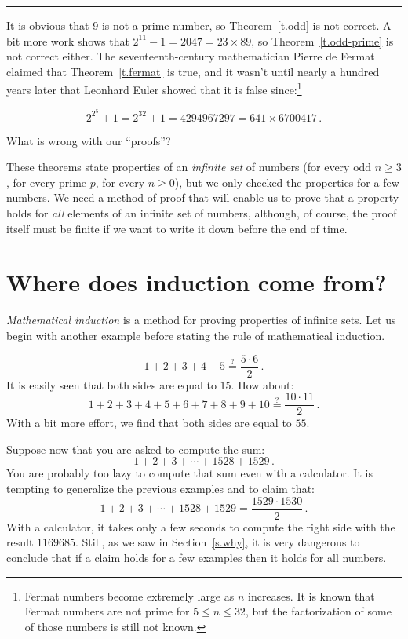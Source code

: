 \documentclass[11pt,a4paper]{report}
\newcommand*{\qeq}{\stackrel{?}{=}}
\newcommand*{\qed}{\hfill\rule{1ex}{1.5ex}}
\newcommand*{\qedd}[1]{\vspace*{-#1ex}\qed}
\begin{document}
\qedd{4}

It is obvious that $9$ is not a prime number, so Theorem~\ref{t.odd} is not correct. A bit more work shows that $2^{11}-1=2047=23\times 89$, so Theorem~\ref{t.odd-prime} is not correct either. The seventeenth-century mathematician Pierre de Fermat claimed that Theorem~\ref{t.fermat} is true, and it wasn't until nearly a hundred years later that Leonhard Euler showed that it is false since:\footnote{Fermat numbers become extremely large as $n$ increases. It is known that Fermat numbers are not prime for $5\leq n \leq 32$, but the factorization of some of those numbers is still not known.}

\[2^{2^5}+1 = 2^{32}+1 = 4294967297 = 641 \times 6700417\,.\]

What is wrong with our ``proofs''?

These theorems state properties of an \emph{infinite set} of numbers (for every odd $n\geq 3$, for every prime $p$, for every $n\geq 0$), but we only checked the properties for a few numbers. We need a method of proof that will enable us to prove that a property holds for \emph{all} elements of an infinite set of numbers, although, of course, the proof itself must be finite if we want to write it down before the end of time.

\section{Where does induction come from?}\label{s.where}

\emph{Mathematical induction} is a method for proving properties of infinite sets. Let us begin with another example before stating the rule of mathematical induction.

\[
1+2+3+4+5\qeq{}\frac{5\cdot 6}{2}\,.
\]
It is easily seen that both sides are equal to $15$. How about:
\[
1+2+3+4+5+6+7+8+9+10\qeq{}\frac{10\cdot 11}{2}\,.
\]
With a bit more effort, we find that both sides are equal to $55$.

Suppose now that you are asked to compute the sum:
\[
1+2+3+\cdots+1528+1529\,.
\]
You are probably too lazy to compute that sum even with a calculator. It is tempting to generalize the previous examples and to claim that:
\[
1+2+3+\cdots+1528+1529=\frac{1529\cdot 1530}{2}\,.
\]
With a calculator, it takes only a few seconds to compute the right side with the result $1169685$. Still, as we saw in Section~\ref{s.why}, it is very dangerous to conclude that if a claim holds for a few examples then it holds for all numbers.
\end{document}
